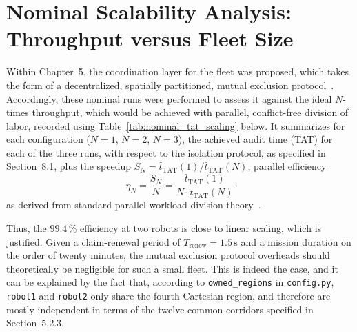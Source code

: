 \section{Nominal Scalability Analysis: Throughput versus Fleet Size}

Within Chapter~5, the coordination layer for the fleet was proposed, which takes the form of a decentralized, spatially partitioned, mutual exclusion protocol~\cite{pereira2023multi}. Accordingly, these nominal runs were performed to assess it against the ideal $N$-times throughput, which would be achieved with parallel, conflict-free division of labor, recorded using Table~\ref{tab:nominal_tat_scaling} below. It summarizes for each configuration ($N=1$, $N=2$, $N=3$), the achieved audit time (TAT) for each of the three runs, with respect to the isolation protocol, as specified in Section~8.1, plus the speedup $S_N = \bar{t}_{\text{TAT}}(1)/\bar{t}_{\text{TAT}}(N)$, parallel efficiency
\begin{equation}
\eta_N = \frac{S_N}{N} = \frac{\bar{t}_{\text{TAT}}(1)}{N \cdot \bar{t}_{\text{TAT}}(N)} \label{eq:parallel_efficiency}
\end{equation}
as derived from standard parallel workload division theory~\cite{ribeiro2025parallel}.

\begin{table}[htbp]
\centering
\caption{Total Audit Time (TAT) across nominal fleet-size configurations, three repetitions each.}
\label{tab:nominal_tat_scaling}
\end{table}

Thus, the $99.4\,\%$ efficiency at two robots is close to linear scaling, which is justified. Given a claim-renewal period of $T_{\text{renew}} = 1.5\,\text{s}$ and a mission duration on the order of twenty minutes, the mutual exclusion protocol overheads should theoretically be negligible for such a small fleet. This is indeed the case, and it can be explained by the fact that, according to \texttt{owned\_regions} in \texttt{config.py}, \texttt{robot1} and \texttt{robot2} only share the fourth Cartesian region, and therefore are mostly independent in terms of the twelve common corridors specified in Section~5.2.3.

